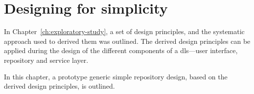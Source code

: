 \chapter{Designing for simplicity\label{ch:implementation}}

In Chapter~\ref{ch:exploratory-study}, a set of design principles, and the systematic approach used to derived them was outlined. The derived design principles can be applied during the design of the different components of a \gls{dls}---user interface, repository and service layer.

In this chapter, a prototype generic simple repository design, based on the derived design principles, is outlined.

\begin{comment}
 http://www.cs.wustl.edu/~schmidt/PDF/design-principles4.pdf


\textbf{Please see
this -> \url{https://github.s3.amazonaws.com/media/progit.en.pdf} on page 173
for a really neat way of presenting diagrams ***}
\end{comment}


%
%
